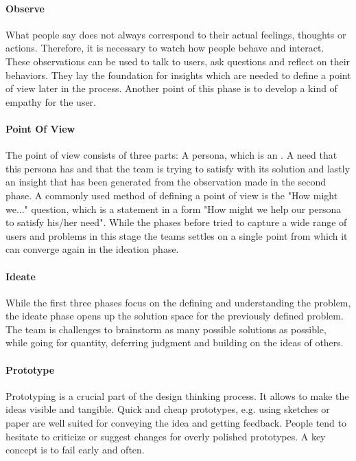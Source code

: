 \paragraph{Observe}
What people say does not always correspond to their actual feelings, thoughts or actions. Therefore, it is necessary to watch how people behave and interact. These observations can be used to talk to users, ask questions and reflect on their behaviors. They lay the foundation for insights which are needed to define a point of view later in the process. Another point of this phase is to develop a kind of empathy for the user.

\paragraph{Point Of View}
The point of view consists of three parts: A persona, which is an . A need that this persona has and that the team is trying to satisfy with its solution and lastly an insight that has been generated from the observation made in the second phase. A commonly used method of defining a point of view is the "How might we..." question, which is a statement in a form "How might we help our persona to satisfy his/her need".
While the phases before tried to capture a wide range of users and problems in this stage the teams settles on a single point from which it can converge again in the ideation phase.

\paragraph{Ideate}
While the first three phases focus on the defining and understanding the problem, the ideate phase opens up the solution space for the previously defined problem. The team is challenges to brainstorm as many possible solutions as possible, while going for quantity, deferring judgment and building on the ideas of others.

\paragraph{Prototype}
Prototyping is a crucial part of the design thinking process. It allows to make the ideas visible and tangible. Quick and cheap prototypes, e.g. using sketches or paper are well suited for conveying the idea and getting feedback. People tend to hesitate to criticize or suggest changes for overly polished prototypes. A key concept is to fail early and often.

